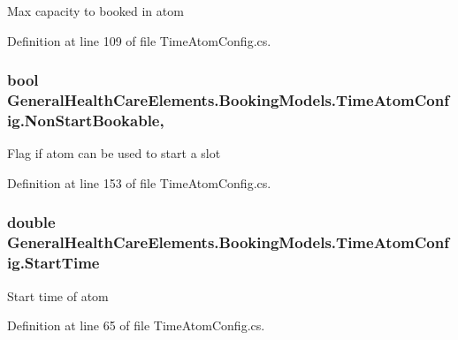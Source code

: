Max capacity to booked in atom 



Definition at line 109 of file Time\+Atom\+Config.\+cs.

\subsubsection[{\texorpdfstring{Non\+Start\+Bookable}{NonStartBookable}}]{\setlength{\rightskip}{0pt plus 5cm}bool General\+Health\+Care\+Elements.\+Booking\+Models.\+Time\+Atom\+Config.\+Non\+Start\+Bookable\hspace{0.3cm}{\ttfamily [get]}, {\ttfamily [set]}}\hypertarget{class_general_health_care_elements_1_1_booking_models_1_1_time_atom_config_a6e515c1f0e15d2b091dec57ef434543b}{}\label{class_general_health_care_elements_1_1_booking_models_1_1_time_atom_config_a6e515c1f0e15d2b091dec57ef434543b}


Flag if atom can be used to start a slot 



Definition at line 153 of file Time\+Atom\+Config.\+cs.

\subsubsection[{\texorpdfstring{Start\+Time}{StartTime}}]{\setlength{\rightskip}{0pt plus 5cm}double General\+Health\+Care\+Elements.\+Booking\+Models.\+Time\+Atom\+Config.\+Start\+Time\hspace{0.3cm}{\ttfamily [get]}}\hypertarget{class_general_health_care_elements_1_1_booking_models_1_1_time_atom_config_ae73eba8913d694592d2e173bcd005369}{}\label{class_general_health_care_elements_1_1_booking_models_1_1_time_atom_config_ae73eba8913d694592d2e173bcd005369}


Start time of atom 



Definition at line 65 of file Time\+Atom\+Config.\+cs.

